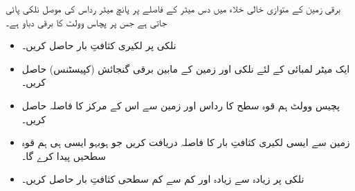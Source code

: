 برقی زمین کے متوازی خالی خلاء میں دس میٹر کے فاصلے پر پانچ میٹر رداس کی موصل نلکی پائی جاتی ہے جس پر پچاس وولٹ کا برقی دباو ہے۔
\begin{itemize}
\item
نلکی پر لکیری کثافتِ بار حاصل کریں۔
\item
ایک میٹر لمبائی کے لئے نلکی اور زمین کے مابین برقی گنجائش (کپیسٹنس) حاصل کریں۔
\item
پچیس وولٹ ہم قوہ سطح کا رداس اور زمین سے اس کے مرکز کا فاصلہ حاصل کریں۔ 
\item
زمین سے ایسی لکیری کثافتِ بار کا فاصلہ دریافت کریں جو ہوبہو ایسی ہی ہم قوہ سطحیں پیدا کرے گا۔
\item
نلکی پر زیادہ سے زیادہ  اور کم سے کم سطحی کثافتِ بار حاصل کریں۔

\end{itemize}

